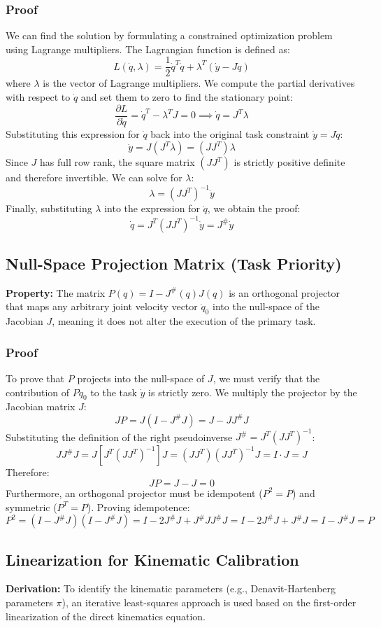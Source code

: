\documentclass[11pt,a4paper]{article}
\begin{document}
\subsubsection{Proof}
We can find the solution by formulating a constrained optimization problem using Lagrange multipliers.
The Lagrangian function is defined as:
\[
L(\dot{q}, \lambda) = \frac{1}{2} \dot{q}^T \dot{q} + \lambda^T (\dot{y} - J \dot{q})
\]
where $\lambda$ is the vector of Lagrange multipliers. 
We compute the partial derivatives with respect to $\dot{q}$ and set them to zero to find the stationary point:
\[
\frac{\partial L}{\partial \dot{q}} = \dot{q}^T - \lambda^T J = 0 \implies \dot{q} = J^T \lambda
\]
Substituting this expression for $\dot{q}$ back into the original task constraint $\dot{y} = J\dot{q}$:
\[
\dot{y} = J (J^T \lambda) = (J J^T) \lambda
\]
Since $J$ has full row rank, the square matrix $(J J^T)$ is strictly positive definite and therefore invertible. We can solve for $\lambda$:
\[
\lambda = (J J^T)^{-1} \dot{y}
\]
Finally, substituting $\lambda$ into the expression for $\dot{q}$, we obtain the proof:
\[
\dot{q} = J^T (J J^T)^{-1} \dot{y} = J^\# \dot{y}
\]


\subsection{Null-Space Projection Matrix (Task Priority)}
\textbf{Property:} The matrix $P(q) = I - J^\#(q)J(q)$ is an orthogonal projector that maps any arbitrary joint velocity vector $\dot{q}_0$ into the null-space of the Jacobian $J$, meaning it does not alter the execution of the primary task.

\subsubsection{Proof}
To prove that $P$ projects into the null-space of $J$, we must verify that the contribution of $P \dot{q}_0$ to the task $\dot{y}$ is strictly zero. We multiply the projector by the Jacobian matrix $J$:
\[
J P = J (I - J^\# J) = J - J J^\# J
\]
Substituting the definition of the right pseudoinverse $J^\# = J^T(JJ^T)^{-1}$:
\[
J J^\# J = J \left[ J^T(JJ^T)^{-1} \right] J = (JJ^T)(JJ^T)^{-1}J = I \cdot J = J
\]
Therefore:
\[
J P = J - J = 0
\]
Furthermore, an orthogonal projector must be idempotent ($P^2 = P$) and symmetric ($P^T = P$).
Proving idempotence:
\[
P^2 = (I - J^\# J)(I - J^\# J) = I - 2J^\# J + J^\# J J^\# J = I - 2J^\# J + J^\# J = I - J^\# J = P
\]


\subsection{Linearization for Kinematic Calibration}
\textbf{Derivation:} To identify the kinematic parameters (e.g., Denavit-Hartenberg parameters $\pi$), an iterative least-squares approach is used based on the first-order linearization of the direct kinematics equation.
\end{document}
